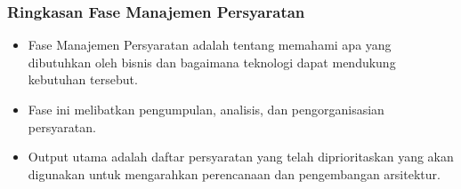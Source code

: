 \documentclass{beamer}
\begin{document}
\begin{frame}
\frametitle{Ringkasan Fase Manajemen Persyaratan}
\begin{itemize}
\item Fase Manajemen Persyaratan adalah tentang memahami apa yang dibutuhkan oleh bisnis dan bagaimana teknologi dapat mendukung kebutuhan tersebut.
\item Fase ini melibatkan pengumpulan, analisis, dan pengorganisasian persyaratan.
\item Output utama adalah daftar persyaratan yang telah diprioritaskan yang akan digunakan untuk mengarahkan perencanaan dan pengembangan arsitektur.
\end{itemize}
\end{frame}
\end{document}
